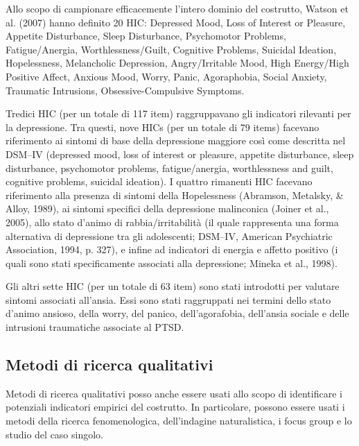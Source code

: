 \begin{exmp}
Allo scopo di campionare efficacemente l'intero dominio del costrutto, Watson et al. (2007) hanno definito 20 HIC: 
Depressed Mood, Loss of Interest or Pleasure, Appetite Disturbance, 
Sleep Disturbance, 
Psychomotor Problems, 
Fatigue/Anergia, 
Worthlessness/Guilt, 
Cognitive Problems, 
Suicidal Ideation, 
Hopelessness, 
Melancholic Depression, 
Angry/Irritable Mood, 
High Energy/High Positive Affect, 
Anxious Mood, 
Worry, 
Panic, 
Agoraphobia, 
Social Anxiety, 
Traumatic Intrusions, 
Obsessive-Compulsive Symptoms. 

Tredici HIC (per un totale di 117 item) raggruppavano gli indicatori rilevanti per la depressione.  Tra questi, nove HICs (per un totale di 79 items) facevano riferimento ai sintomi di base della depressione maggiore così come descritta nel DSM–IV (depressed mood, loss of interest or pleasure, appetite disturbance, sleep disturbance, psychomotor problems, fatigue/anergia, worthlessness and guilt, cognitive problems, suicidal ideation). I quattro rimanenti HIC facevano riferimento alla presenza di sintomi della Hopelessness (Abramson, Metalsky, \& Alloy, 1989), ai sintomi specifici della depressione malinconica (Joiner et al., 2005), allo stato d'animo di rabbia/irritabilità  
(il quale rappresenta una forma alternativa di depressione tra gli adolescenti; DSM–IV, American Psychiatric Association, 1994, p. 327), e infine ad indicatori di energia e affetto positivo (i quali sono stati specificamente associati alla depressione; Mineka et al., 1998).

Gli altri sette HIC (per un totale di 63 item) sono stati introdotti per valutare sintomi associati all'ansia. Essi sono stati raggruppati nei termini dello stato d'animo ansioso, della worry, del panico, dell'agorafobia, dell'ansia sociale e delle intrusioni traumatiche associate al PTSD. 

\end{exmp}


\subsection{Metodi di ricerca qualitativi}

Metodi di ricerca qualitativi posso anche essere usati allo scopo di identificare i potenziali indicatori empirici del costrutto.  In particolare, possono essere usati i metodi della ricerca fenomenologica, dell'indagine naturalistica, i focus group e lo studio del caso singolo. 


